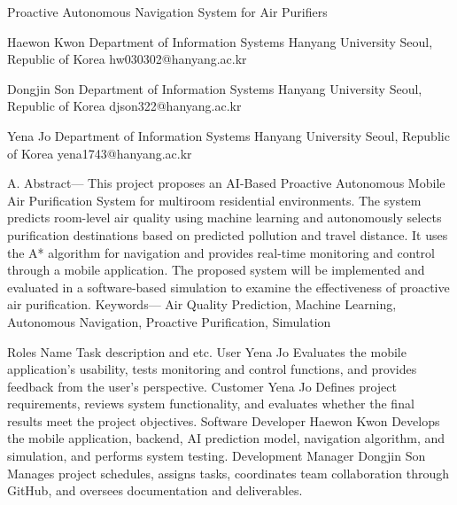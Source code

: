 Proactive Autonomous Navigation System 
for Air Purifiers 
 
Haewon Kwon 
Department of Information Systems
Hanyang University
Seoul, Republic of Korea
hw030302@hanyang.ac.kr

Dongjin Son
Department of Information Systems
Hanyang University
Seoul, Republic of Korea 
djson322@hanyang.ac.kr

Yena Jo
Department of Information Systems
Hanyang University
Seoul, Republic of Korea 
yena1743@hanyang.ac.kr 
 
 
 
 
A.	Abstract— This project proposes an AI-Based Proactive Autonomous Mobile Air Purification System for multiroom residential environments. 
The system predicts room-level air quality using machine learning and autonomously selects purification destinations based on predicted pollution and travel distance. It uses the A* algorithm for navigation and provides real-time monitoring and control through a mobile application. The proposed system will be implemented and evaluated in a software-based simulation to examine the effectiveness of proactive air purification.
Keywords— Air Quality Prediction, Machine Learning, Autonomous Navigation, Proactive Purification, Simulation

Roles	Name	Task description and etc.
User	Yena Jo	Evaluates the mobile application's usability, tests monitoring and control functions, and provides feedback from the user's perspective.
Customer	Yena Jo	Defines project requirements, reviews system functionality, and evaluates whether the final results meet the project objectives.
Software Developer	Haewon Kwon	Develops the mobile application, backend, AI prediction model, navigation algorithm, and simulation, and performs system testing.
Development Manager	Dongjin Son	Manages project schedules, assigns tasks, coordinates team collaboration through GitHub, and oversees documentation and deliverables.

